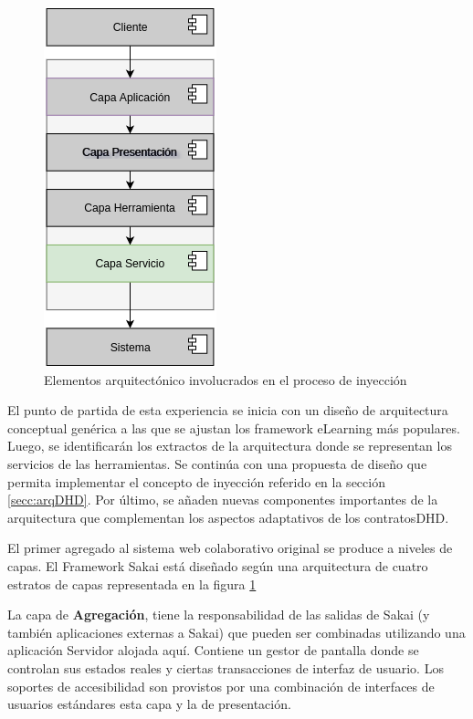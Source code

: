 \begin{figure}
\begin{center}
\includegraphics[width=2.5 in,totalheight=3 in]{Ch2/felo.png}
\caption{Elementos arquitectónico involucrados en el proceso de inyección} \label{fig:FeLO}
\end{center}
\end{figure} 


El punto de partida de esta experiencia se inicia con un diseño de arquitectura conceptual genérica a las que se ajustan los framework eLearning más populares. Luego, se identificarán los extractos de la arquitectura donde se representan los servicios de las herramientas. Se continúa con una propuesta de diseño que permita implementar el concepto de inyección referido en la sección \ref{secc:arqDHD}. Por último, se añaden nuevas componentes importantes de la arquitectura que complementan los aspectos adaptativos de los contratosDHD. 

El primer agregado al sistema web colaborativo original se produce a niveles de capas. El Framework Sakai está diseñado según una arquitectura de cuatro estratos de capas representada en la figura \ref{fig:FeLO}

La capa de \textbf{Agregación}, tiene la responsabilidad de las salidas de Sakai (y también aplicaciones externas a Sakai) que pueden ser combinadas utilizando una aplicación Servidor alojada aquí. Contiene un gestor de pantalla donde se controlan sus estados reales y ciertas transacciones de interfaz de usuario. Los soportes de accesibilidad son provistos por una combinación de interfaces de usuarios estándares esta capa y la de presentación.

